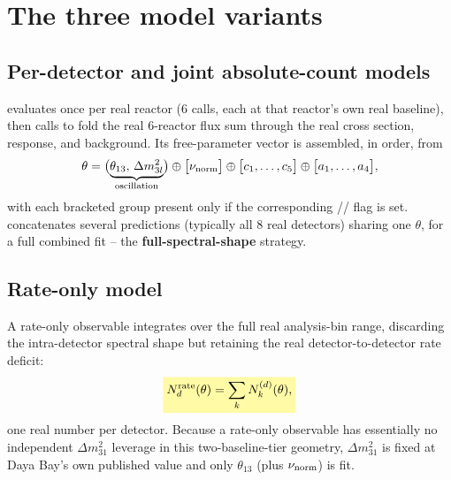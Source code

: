 \section{The three model variants}
\label{sec:model-variants}


\subsection*{Per-detector and joint absolute-count models}

\begin{theorybox}
 evaluates 
once per real reactor (6 calls, each at that reactor's own real baseline),
then calls  to fold the real
6-reactor flux sum through the real cross section, response, and
background. Its free-parameter vector is assembled, in order, from
\begin{equation}
  \theta = \bigl(\underbrace{\theta_{13},\,\Delta m^2_{3l}}_{\rm oscillation}\bigr)
  \oplus \bigl[\nu_{\rm norm}\bigr]
  \oplus \bigl[c_1,\dots,c_5\bigr]
  \oplus \bigl[a_1,\dots,a_4\bigr],
  \label{eq:theta-assembly}
\end{equation}
with each bracketed group present only if the corresponding
// flag
is set.  concatenates several
 predictions (typically all 8 real
detectors) sharing one $\theta$, for a full combined fit -- the
\textbf{full-spectral-shape} strategy.
\end{theorybox}

\subsection*{Rate-only model}

\begin{theorybox}
A rate-only observable integrates 
over the full real analysis-bin range, discarding the intra-detector
spectral shape but retaining the real detector-to-detector rate deficit:
\begin{equation}
  \keyresult{N_d^{\rm rate}(\theta) = \sum_k N_k^{(d)}(\theta),}
  \label{eq:rate-only-observable}
\end{equation}
one real number per detector. Because a rate-only observable has
essentially no independent $\Delta m^2_{31}$ leverage in this two-baseline-tier
geometry, $\Delta m^2_{31}$ is fixed at Daya Bay's own published value and
only $\theta_{13}$ (plus $\nu_{\rm norm}$) is fit.
\end{theorybox}

